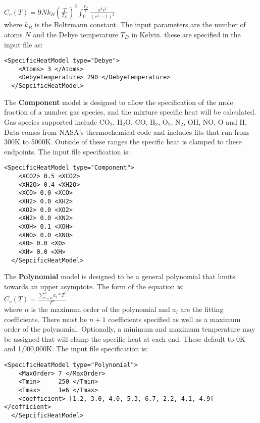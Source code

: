 \begingroup
\everymath{\normalsize}
$C_v(T)=9Nk_B\left(\frac{T}{T_D}\right)^3\int_0^\frac{T_D}{T} \! \frac{x^4e^x}{\left(e^x-1\right)^2}$
\endgroup
\\

\noindent where $k_B$ is the Boltzmann constant. The input parameters are the number of atoms $N$ and the Debye temperature $T_D$ in Kelvin.  these are specified in the input file as:
%
\begin{Verbatim}[fontsize=\footnotesize]
  <SpecificHeatModel type="Debye">
    <Atoms> 3 </Atoms>
    <DebyeTemperature> 290 </DebyeTemperature>
  </SepcificHeatModel>
\end{Verbatim}
%
The \textbf{Component} model is designed to allow the specification of the mole fraction of a number gas species, and the mixture specific heat will be calculated.  Gas species supported include CO$_2$, H$_2$O, CO, H$_2$, O$_2$, N$_2$, OH, NO, O and H.  Data comes from NASA's thermochemical code and includes fits that run from 300K to 5000K.  Outside of these ranges the specific heat is clamped to these endpoints.  The input file specification is:
%
\begin{Verbatim}[fontsize=\footnotesize]
  <SpecificHeatModel type="Component">
    <XCO2> 0.5 <XCO2>
    <XH2O> 0.4 <XH2O>
    <XCO> 0.0 <XCO>
    <XH2> 0.0 <XH2>
    <XO2> 0.0 <XO2>
    <XN2> 0.0 <XN2>
    <XOH> 0.1 <XOH>
    <XNO> 0.0 <XNO>
    <XO> 0.0 <XO>
    <XH> 0.0 <XH>
  </SepcificHeatModel>
\end{Verbatim}
%
The \textbf{Polynomial} model is designed to be a general polynomial that limits towards an upper asymptote.  The form of the equation is:
\\

\begingroup
\everymath{\normalsize}
$C_v(T)=\frac{\sum\limits_{i=0}^n a_i*T^i}{T^n}$
\endgroup
\\

\noindent where $n$ is the maximum order of the polynomial and $a_i$ are the fitting coefficients.  There must be $n+1$ coefficients specified as well as a maximum order of the polynomial.  Optionally, a minimum and maximum temperature may be assigned that will clamp the specific heat at each end. These default to 0K and 1,000,000K. The input file specification is:
%
\begin{Verbatim}[fontsize=\footnotesize]
  <SpecificHeatModel type="Polynomial">
    <MaxOrder> 7 </MaxOrder>
    <Tmin>     250 </Tmin>
    <Tmax>     1e6 </Tmax>
    <coefficient> [1.2, 3.0, 4.0, 5.3, 6.7, 2.2, 4.1, 4.9] </cofficient>
  </SepcificHeatModel>
\end{Verbatim}
% 
%

